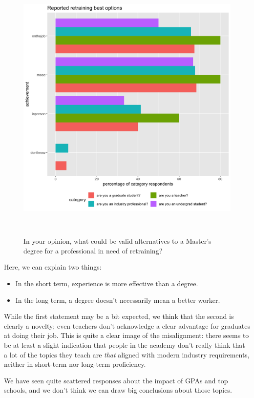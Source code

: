 \documentclass{sigchi}
\begin{document}
\begin{figure}
  \includegraphics[scale=0.2]{../data-analysis/plots_output/Reported_retraining_best_options.png}
  \caption{In your opinion, what could be valid alternatives to a Master's degree for a professional in need of retraining?}~\label{fig:figure13}
\end{figure}

Here, we can explain two things:
\begin{itemize}
	\item In the short term, experience is more effective than a degree.
	\item In the long term, a degree doesn't necessarily mean a better worker.	
\end{itemize}

While the first statement may be a bit expected, we think that the second is clearly a novelty; even teachers don't acknowledge a clear advantage for graduates at doing their job. This is quite a clear image of the misalignment: there seems to be at least a slight indication that people in the academy don't really think that a lot of the topics they teach are \textit{that} aligned with modern industry requirements, neither in short-term nor long-term proficiency.

We have seen quite scattered responses about the impact of GPAs and top schools, and we don't think we can draw big conclusions about those topics.
\end{document}
